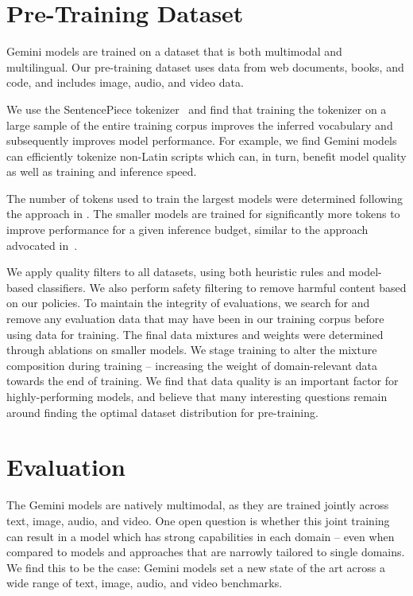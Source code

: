 \section{Pre-Training Dataset}
\label{sec:data}

Gemini models are trained on a dataset that is both multimodal and multilingual. Our pre-training dataset uses data from web documents, books, and code, and includes image, audio, and video data.

We use the SentencePiece tokenizer~\cite{sentencepiece} and find that training the tokenizer on a large sample of the entire training corpus improves the inferred vocabulary and subsequently improves model performance. For example, we find Gemini models can efficiently tokenize non-Latin scripts which can, in turn, benefit model quality as well as training and inference speed.

The number of tokens used to train the largest models were determined following the approach in \citet{chinchilla}. The smaller models are trained for significantly more tokens to improve performance for a given inference budget, similar to the approach advocated in~\citet{llama}. 

We apply quality filters to all datasets, using both heuristic rules and model-based classifiers. We also perform safety filtering to remove harmful content based on our policies. To maintain the integrity of evaluations, we search for and remove any evaluation data that may have been in our training corpus before using data for training. The final data mixtures and weights were determined through ablations on smaller models. We stage training to alter the mixture composition during training – increasing the weight of domain-relevant data towards the end of training. We find that data quality is an important factor for highly-performing models, and believe that many interesting questions remain around finding the optimal dataset distribution for pre-training.

\section{Evaluation}
\label{sec:eval}

The Gemini models are natively multimodal, as they are trained jointly across text, image, audio, and video. One open question is whether this joint training can result in a model which has strong capabilities in each domain – even when compared to models and approaches that are narrowly tailored to single domains. We find this to be the case: Gemini models set a new state of the art across a wide range of text, image, audio, and video benchmarks. 

